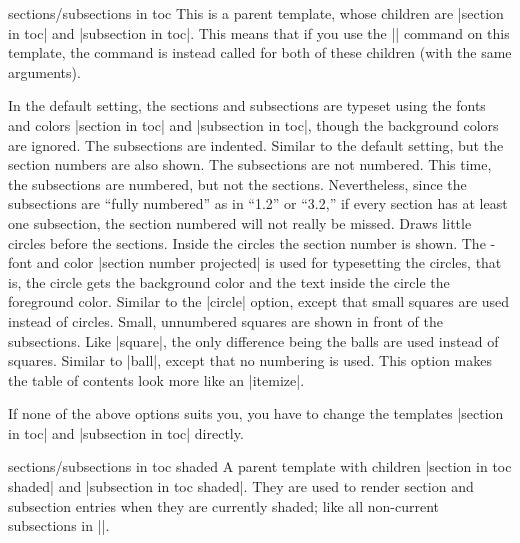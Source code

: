 \begin{command}{\tableofcontents{}}
  \begin{element}{sections/subsections in toc}\semiyes\no\no
    This is a parent template, whose children are
    |section in toc| and |subsection in toc|. This means that if you
    use the |\setbeamertemplate| command on this template, the command
    is instead called for both of these children (with the same arguments).

    \begin{templateoptions}
      In the default setting, the sections and subsections are typeset
      using the fonts and colors |section in toc| and
      |subsection in toc|, though the background colors are ignored. The
      subsections are indented.
      Similar to the default setting, but the section numbers are also
      shown. The subsections are not numbered.
      This time, the subsections are numbered, but not the
      sections. Nevertheless, since the subsections are ``fully
      numbered'' as in ``1.2'' or ``3.2,'' if every section has at least
      one subsection, the section numbered will not really be missed.
      Draws little circles before the sections. Inside
      the circles the section number is shown. The \beamer-font and
      color |section number projected| is used for typesetting the
      circles, that is, the circle gets the background color and the
      text inside the circle the foreground color.
      Similar to the |circle| option, except that small squares are
      used instead of circles. Small, unnumbered squares are shown in
      front of the subsections.
      Like |square|, the only difference being the balls are used
      instead of squares.
      Similar to |ball|, except that no numbering is used. This option
      makes the table of contents look more like an |itemize|.
    \end{templateoptions}

    If none of the above options suits you, you have to change the
    templates |section in toc| and |subsection in toc| directly.
  \end{element}

  \begin{element}{sections/subsections in toc shaded}\semiyes\no\no
    A parent template with children
    |section in toc shaded| and |subsection in toc shaded|. They are
    used to render section and subsection entries when
    they are currently shaded; like all non-current subsections in
    |\tableofcontents[currentsubsection]|.


\end{element}
\end{command}
